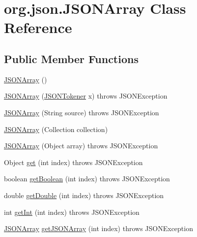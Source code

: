 \hypertarget{classorg_1_1json_1_1_j_s_o_n_array}{\section{org.\-json.\-J\-S\-O\-N\-Array Class Reference}
\label{classorg_1_1json_1_1_j_s_o_n_array}
}
\subsection*{Public Member Functions}
\begin{DoxyCompactItemize}
\item 
\hyperlink{classorg_1_1json_1_1_j_s_o_n_array_abf6f4be98df2bcc1fa7e08881bf1accd}{J\-S\-O\-N\-Array} ()
\item 
\hyperlink{classorg_1_1json_1_1_j_s_o_n_array_a9e8972d5f64b8fc6b7fca9169d29421a}{J\-S\-O\-N\-Array} (\hyperlink{classorg_1_1json_1_1_j_s_o_n_tokener}{J\-S\-O\-N\-Tokener} x)  throws J\-S\-O\-N\-Exception 
\item 
\hyperlink{classorg_1_1json_1_1_j_s_o_n_array_a62861e8a8afbae3fd6b637aeb444b2d4}{J\-S\-O\-N\-Array} (String source)  throws J\-S\-O\-N\-Exception 
\item 
\hyperlink{classorg_1_1json_1_1_j_s_o_n_array_ad8d5fa088a11f7fcb7ef328577c9c7a1}{J\-S\-O\-N\-Array} (Collection collection)
\item 
\hyperlink{classorg_1_1json_1_1_j_s_o_n_array_a22e9287f807d9846f4cb7d4bd300f2eb}{J\-S\-O\-N\-Array} (Object array)  throws J\-S\-O\-N\-Exception 
\item 
Object \hyperlink{classorg_1_1json_1_1_j_s_o_n_array_a3a8413753f53e0c0a5e008816c915eae}{get} (int index)  throws J\-S\-O\-N\-Exception 
\item 
boolean \hyperlink{classorg_1_1json_1_1_j_s_o_n_array_ac7b9da6fc6276ca0211a5bfb80d0f059}{get\-Boolean} (int index)  throws J\-S\-O\-N\-Exception 
\item 
double \hyperlink{classorg_1_1json_1_1_j_s_o_n_array_a1cd0e0c302e4acfe0393e6fbbc9a1c72}{get\-Double} (int index)  throws J\-S\-O\-N\-Exception 
\item 
int \hyperlink{classorg_1_1json_1_1_j_s_o_n_array_a1698dd185adbfa34dde18b2bef7f1e15}{get\-Int} (int index)  throws J\-S\-O\-N\-Exception 
\item 
\hyperlink{classorg_1_1json_1_1_j_s_o_n_array}{J\-S\-O\-N\-Array} \hyperlink{classorg_1_1json_1_1_j_s_o_n_array_a5d52943e4ca5982916b61aaa898dadad}{get\-J\-S\-O\-N\-Array} (int index)  throws J\-S\-O\-N\-Exception 

\end{DoxyCompactItemize}
